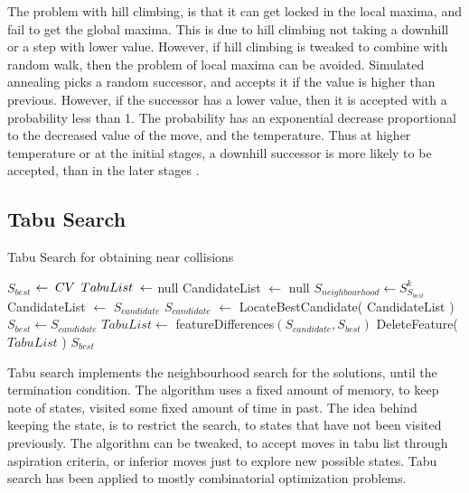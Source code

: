 The problem with hill climbing, is that it can get locked in the local maxima, and fail to get the global maxima.
This is due to hill climbing not taking a downhill or a step with lower value. However, if hill climbing is 
tweaked to combine with random walk, then the problem of local maxima can be avoided. Simulated annealing picks
a random successor, and accepts it if the value is higher than previous. However, if the successor has a lower
value, then it is accepted with a probability less than 1. The probability has an exponential decrease proportional
to the decreased value of the move, and the temperature. Thus at higher temperature or at the initial stages, a
downhill successor is more likely to be accepted, than in the later stages \cite{00033}.

\subsection{Tabu Search}

\begin{algorithm}[h]
  \caption{ Tabu Search for obtaining near collisions \cite{00036}}
  \begin{algorithmic}[1]
      \State $S_{best}$ $\gets \thickspace CV$
      \State $TabuList \thickspace \gets$ null
        \State CandidateList $\gets$ null
        \State $S_{neighbourhood} \gets S^{k}_{S_{best}}$
            \State CandidateList $\gets$ $S_{candidate}$
          \EndIf
        \EndFor
        \State $S_{candidate}$ $\gets$ LocateBestCandidate( CandidateList )
          \State $S_{best} \gets S_{candidate}$
          \State $TabuList \gets$ featureDifferences$(S_{candidate}, S_{best})$
            \State DeleteFeature( $TabuList$ )
          \EndWhile
        \EndIf
      \EndWhile 
      \State \Return $S_{best}$
    \EndFunction
  \end{algorithmic}
\end{algorithm}

Tabu search implements the neighbourhood search for the solutions, until the termination condition. The algorithm
uses a fixed amount of memory, to keep note of states, visited some fixed amount of time in past. The idea behind
keeping the state, is to restrict the search, to states that have not been visited previously. The algorithm can be
tweaked, to accept moves in tabu list through aspiration criteria, or inferior moves just to explore new possible
states. Tabu search has been applied to mostly combinatorial optimization problems\cite{00034, 00035}.

